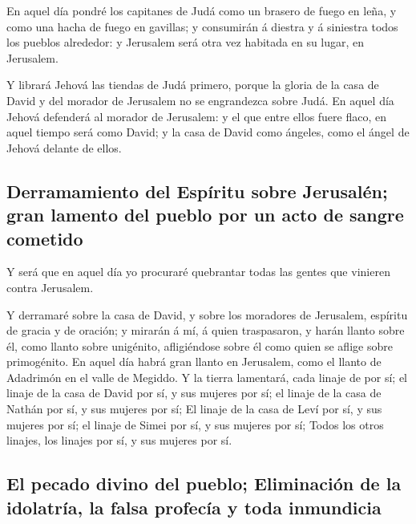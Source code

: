  En aquel día pondré los capitanes de Judá como un brasero
de fuego en leña, y como una hacha de fuego en gavillas; y consumirán á
diestra y á siniestra todos los pueblos alrededor: y Jerusalem será otra
vez habitada en su lugar, en Jerusalem.

 Y librará Jehová las tiendas de Judá primero, porque la
gloria de la casa de David y del morador de Jerusalem no se engrandezca
sobre Judá.  En aquel día Jehová defenderá al morador de
Jerusalem: y el que entre ellos fuere flaco, en aquel tiempo será como
David; y la casa de David como ángeles, como el ángel de Jehová delante
de ellos.

\hypertarget{derramamiento-del-espuxedritu-sobre-jerusaluxe9n-gran-lamento-del-pueblo-por-un-acto-de-sangre-cometido}{%
\subsection{Derramamiento del Espíritu sobre Jerusalén; gran lamento del
pueblo por un acto de sangre
cometido}\label{derramamiento-del-espuxedritu-sobre-jerusaluxe9n-gran-lamento-del-pueblo-por-un-acto-de-sangre-cometido}}

 Y será que en aquel día yo procuraré quebrantar todas las
gentes que vinieren contra Jerusalem.

 Y derramaré sobre la casa de David, y sobre los
moradores de Jerusalem, espíritu de gracia y de oración; y mirarán á mí,
á quien traspasaron, y harán llanto sobre él, como llanto sobre
unigénito, afligiéndose sobre él como quien se aflige sobre primogénito.
 En aquel día habrá gran llanto en Jerusalem, como el
llanto de Adadrimón en el valle de Megiddo.  Y la tierra
lamentará, cada linaje de por sí; el linaje de la casa de David por sí,
y sus mujeres por sí; el linaje de la casa de Nathán por sí, y sus
mujeres por sí;  El linaje de la casa de Leví por sí, y
sus mujeres por sí; el linaje de Simei por sí, y sus mujeres por sí;
 Todos los otros linajes, los linajes por sí, y sus
mujeres por sí.

\hypertarget{el-pecado-divino-del-pueblo-eliminaciuxf3n-de-la-idolatruxeda-la-falsa-profecuxeda-y-toda-inmundicia}{%
\subsection{El pecado divino del pueblo; Eliminación de la idolatría, la
falsa profecía y toda
inmundicia}\label{el-pecado-divino-del-pueblo-eliminaciuxf3n-de-la-idolatruxeda-la-falsa-profecuxeda-y-toda-inmundicia}}

